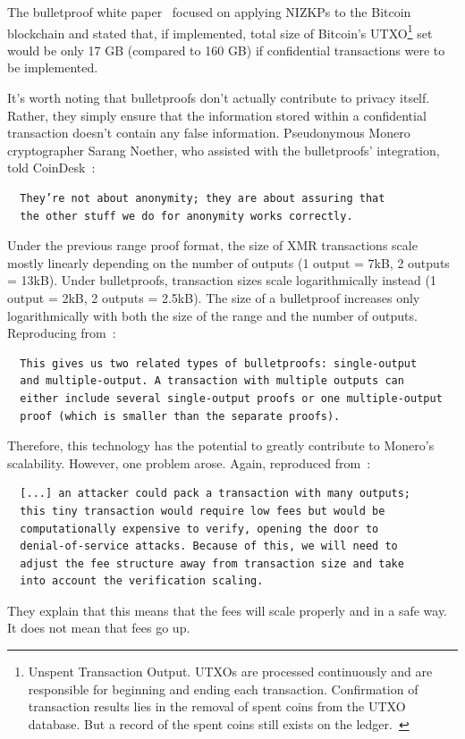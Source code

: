 The bulletproof white paper~\cite{bulletproofs} focused on applying NIZKPs to the Bitcoin blockchain and stated that, if implemented, total size of Bitcoin’s UTXO\footnote{Unspent Transaction Output. UTXOs are processed continuously and are responsible for beginning and ending each transaction. Confirmation of transaction results lies in the removal of spent coins from the UTXO database. But a record of the spent coins still exists on the ledger.~\cite{investopedia}} set would be only 17 GB (compared to 160 GB) if confidential transactions were to be implemented.

It’s worth noting that bulletproofs don’t actually contribute to privacy itself. Rather, they simply ensure that the information stored within a confidential transaction doesn’t contain any false information. Pseudonymous Monero cryptographer Sarang Noether, who assisted with the bulletproofs' integration, told CoinDesk~\cite{coindesk}:
\begin{verbatim}
  They’re not about anonymity; they are about assuring that
  the other stuff we do for anonymity works correctly.
\end{verbatim}

Under the previous range proof format, the size of XMR transactions scale mostly linearly depending on the number of outputs (1 output = 7kB, 2 outputs = 13kB). Under bulletproofs, transaction sizes scale logarithmically instead (1 output = 2kB, 2 outputs = 2.5kB). The size of a bulletproof increases only logarithmically with both the size of the range and the number of outputs. Reproducing from~\cite{getmonero}:
\begin{verbatim}
  This gives us two related types of bulletproofs: single-output
  and multiple-output. A transaction with multiple outputs can
  either include several single-output proofs or one multiple-output
  proof (which is smaller than the separate proofs).
\end{verbatim}

Therefore, this technology has the potential to greatly contribute to Monero’s scalability. However, one problem arose. Again, reproduced from~\cite{getmonero}:
\begin{verbatim}
  [...] an attacker could pack a transaction with many outputs;
  this tiny transaction would require low fees but would be
  computationally expensive to verify, opening the door to
  denial-of-service attacks. Because of this, we will need to
  adjust the fee structure away from transaction size and take
  into account the verification scaling.
\end{verbatim}
They explain that this means that the fees will scale properly and in a safe way. It does not mean that fees go up.
\pagebreak

